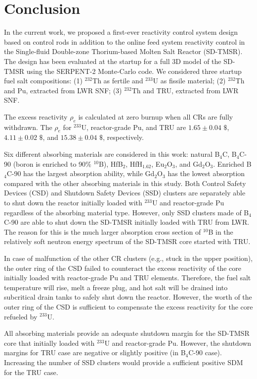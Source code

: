 \section{Conclusion} \label{Conclusion}

In the current work, we proposed a first-ever reactivity control system design based on control rods in addition to the 
online feed system reactivity control in the 
Single-fluid Double-zone Thorium-based Molten Salt Reactor (SD-TMSR). The 
design has been evaluated at the startup for a full 3D model of the SD-TMSR using the
SERPENT-2 Monte-Carlo code. We considered three startup fuel salt compositions:
(1) $^{232}$Th as fertile and $^{233}$U as fissile material; 
(2) $^{232}$Th and Pu, extracted from \gls{LWR} \gls{SNF}; (3) 
$^{232}$Th and TRU, extracted from \gls{LWR} \gls{SNF}.

The excess reactivity $\rho_e$ is calculated at zero burnup when all CRs are 
fully withdrawn. The $\rho_e$ for $^{233}$U, reactor-grade Pu, and 
TRU are $1.65\pm0.04$ $\$$, $4.11\pm0.02$ $\$$, and $15.38\pm0.04$ $\$$, 
respectively.

Six different absorbing materials are considered in this work:
natural B$_4$C, B$_4$C-90 (boron is enriched to 90\% $^{10}$B), HfB$_2$, 
HfH$_{1.62}$, Eu$_2$O$_3$, and Gd$_2$O$_3$. Enriched B$_4$C-90 has the largest 
absorption ability, while Gd$_2$O$_3$ has the lowest absorption compared with 
the other absorbing materials in this study. Both Control Safety Devices (CSD)
and Shutdown Safety Devices (SSD) clusters are 
separately able to shut down the reactor initially loaded with $^{233}$U and 
reactor-grade Pu regardless of the absorbing material type. However, only SSD 
clusters made of B$_4$C-90 are able to shut down the SD-TMSR initially loaded 
with TRU from \gls{LWR}. The reason for this is the much larger 
absorption cross section of $^{10}$B in the relatively soft neutron energy 
spectrum of the SD-TMSR core started with TRU.

In case of malfunction of the other CR clusters (e.g., stuck in the upper 
position), the outer ring of the CSD failed to counteract the excess 
reactivity of the core initially loaded with reactor-grade Pu and TRU elements. Therefore, the fuel salt temperature will rise, melt a freeze plug, and hot salt will be drained into subcritical drain tanks to safely shut down the reactor.
However, the worth of the outer ring of the CSD is sufficient 
to compensate the excess reactivity for the core refueled by $^{233}$U.

All absorbing materials provide an adequate shutdown margin for the SD-TMSR 
core that initially loaded with $^{233}$U and reactor-grade Pu. However, the 
shutdown margins for TRU case are negative or slightly positive (in B$_4$C-90 
case). Increasing the number of SSD clusters would provide a sufficient positive SDM for the TRU case.

